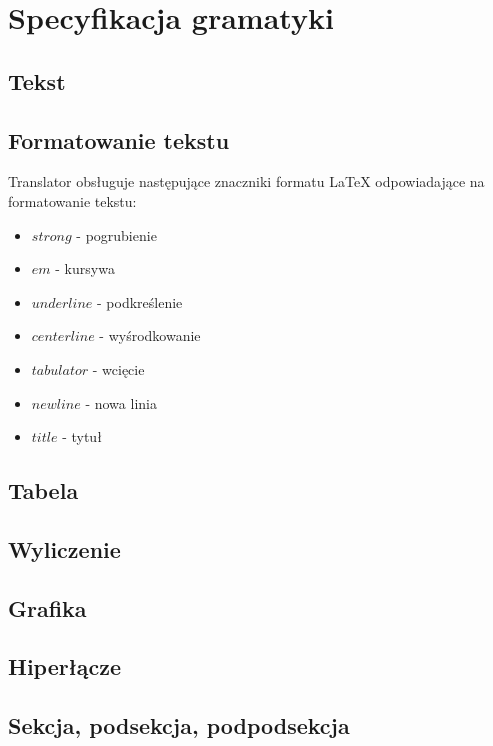 \chapter{Specyfikacja gramatyki}

\section{Tekst}

\section{Formatowanie tekstu}

Translator obsługuje następujące znaczniki formatu LaTeX odpowiadające na formatowanie tekstu:
\begin{itemize}
    \item \textit{$strong$} - pogrubienie
    \item \textit{$em$} - kursywa
    \item \textit{$underline$} - podkreślenie
    \item \textit{$centerline$} - wyśrodkowanie
    \item \textit{$tabulator$} - wcięcie
    \item \textit{$newline$} - nowa linia
    \item \textit{$title$} - tytuł
\end{itemize}

\section{Tabela}

\section{Wyliczenie}

\section{Grafika}

\section{Hiperłącze}

\section{Sekcja, podsekcja, podpodsekcja}


